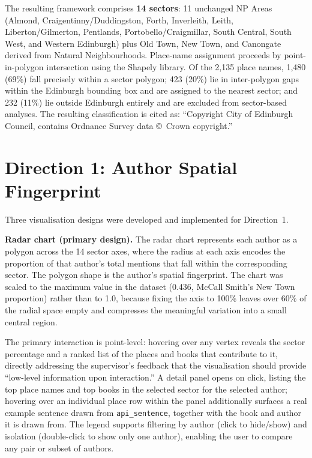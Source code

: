 \documentclass[logo,msc]{infthesis}
\begin{document}
The resulting framework comprises \textbf{14 sectors}: 11 unchanged NP Areas (Almond, Craigentinny/Duddingston, Forth, Inverleith, Leith, Liberton/Gilmerton, Pentlands, Portobello/Craigmillar, South Central, South West, and Western Edinburgh) plus Old Town, New Town, and Canongate derived from Natural Neighbourhoods. Place-name assignment proceeds by point-in-polygon intersection using the Shapely library. Of the 2,135 place names, 1,480 (69\%) fall precisely within a sector polygon; 423 (20\%) lie in inter-polygon gaps within the Edinburgh bounding box and are assigned to the nearest sector; and 232 (11\%) lie outside Edinburgh entirely and are excluded from sector-based analyses. The resulting classification is cited as: ``Copyright City of Edinburgh Council, contains Ordnance Survey data \copyright\ Crown copyright.''
 
\section{Direction 1: Author Spatial Fingerprint}
 
Three visualisation designs were developed and implemented for Direction~1.
 
\textbf{Radar chart (primary design).} The radar chart represents each author as a polygon across the 14 sector axes, where the radius at each axis encodes the proportion of that author's total mentions that fall within the corresponding sector. The polygon shape is the author's spatial fingerprint. The chart was scaled to the maximum value in the dataset (0.436, McCall Smith's New Town proportion) rather than to 1.0, because fixing the axis to 100\% leaves over 60\% of the radial space empty and compresses the meaningful variation into a small central region.
 
The primary interaction is point-level: hovering over any vertex reveals the sector percentage and a ranked list of the places and books that contribute to it, directly addressing the supervisor's feedback that the visualisation should provide ``low-level information upon interaction.'' A detail panel opens on click, listing the top place names and top books in the selected sector for the selected author; hovering over an individual place row within the panel additionally surfaces a real example sentence drawn from \texttt{api\_sentence}, together with the book and author it is drawn from. The legend supports filtering by author (click to hide/show) and isolation (double-click to show only one author), enabling the user to compare any pair or subset of authors.
 
\end{document}
